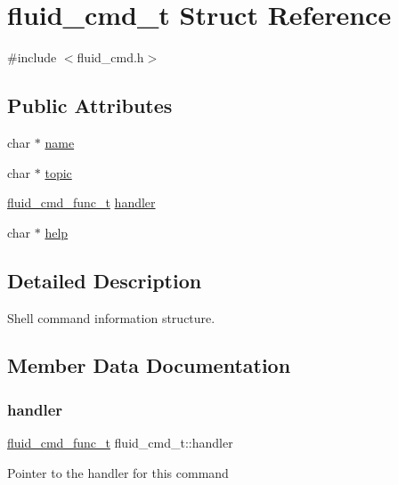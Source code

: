 \hypertarget{structfluid__cmd__t}{}\section{fluid\+\_\+cmd\+\_\+t Struct Reference}
\label{structfluid__cmd__t}


{\ttfamily \#include $<$fluid\+\_\+cmd.\+h$>$}

\subsection*{Public Attributes}
\begin{DoxyCompactItemize}
\item 
char $\ast$ \hyperlink{structfluid__cmd__t_a56b4e96adbae7d91c1d83cad7ca679c1}{name}
\item 
char $\ast$ \hyperlink{structfluid__cmd__t_ac78419632d74badd017050f3e41430b4}{topic}
\item 
\hyperlink{fluid__cmd_8h_ae363cbfd02bca56dd72b9b9e7285481c}{fluid\+\_\+cmd\+\_\+func\+\_\+t} \hyperlink{structfluid__cmd__t_ab1a5c260eb2680e5eeddd49fc7bb4a61}{handler}
\item 
char $\ast$ \hyperlink{structfluid__cmd__t_a0544b09084a4715edbb4e3cbc6e178e1}{help}
\end{DoxyCompactItemize}


\subsection{Detailed Description}
Shell command information structure. 

\subsection{Member Data Documentation}
\mbox{\label{structfluid__cmd__t_ab1a5c260eb2680e5eeddd49fc7bb4a61}} 
\subsubsection{\texorpdfstring{handler}{handler}}
{\footnotesize\ttfamily \hyperlink{fluid__cmd_8h_ae363cbfd02bca56dd72b9b9e7285481c}{fluid\+\_\+cmd\+\_\+func\+\_\+t} fluid\+\_\+cmd\+\_\+t\+::handler}

Pointer to the handler for this command \mbox{\label{structfluid__cmd__t_a0544b09084a4715edbb4e3cbc6e178e1}} 
